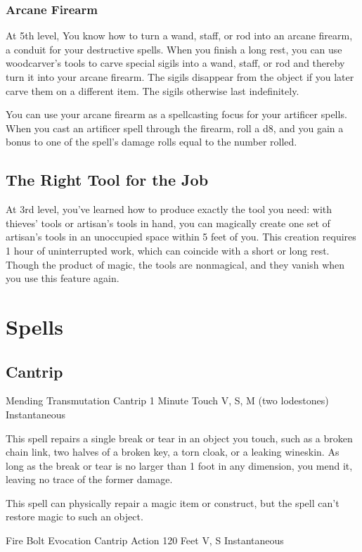 \documentclass[letterpaper,openany,oneside,twocolumn]{book}
\begin{document}
\subsubsection*{Arcane Firearm}
At 5th level, You know how to turn a wand, staff, or rod into an arcane firearm, a conduit for your destructive spells. When you finish a long rest, you can use woodcarver's tools to carve special sigils into a wand, staff, or rod and thereby turn it into your arcane firearm. The sigils disappear from the object if you later carve them on a different item. The sigils otherwise last indefinitely.

You can use your arcane firearm as a spellcasting focus for your artificer spells. When you cast an artificer spell through the firearm, roll a d8, and you gain a bonus to one of the spell's damage rolls equal to the number rolled.
\subsection*{The Right Tool for the Job}
At 3rd level, you've learned how to produce exactly the tool you need: with thieves' tools or artisan's tools in hand, you can magically create one set of artisan's tools in an unoccupied space within 5 feet of you. This creation requires 1 hour of uninterrupted work, which can coincide with a short or long rest. Though the product of magic, the tools are nonmagical, and they vanish when you use this feature again.

\section*{Spells}
\subsection*{Cantrip}

\DndSpellHeader
  {Mending}
  {Transmutation Cantrip}
  {1 Minute}
  {Touch}
  {V, S, M (two lodestones)}
  {Instantaneous}

This spell repairs a single break or tear in an object you touch, such as a broken chain link, two halves of a broken key, a torn cloak, or a leaking wineskin. As long as the break or tear is no larger than 1 foot in any dimension, you mend it, leaving no trace of the former damage.

This spell can physically repair a magic item or construct, but the spell can't restore magic to such an object.

\DndSpellHeader
  {Fire Bolt}
  {Evocation Cantrip}
  {Action}
  {120 Feet}
  {V, S}
  {Instantaneous}
\end{document}
